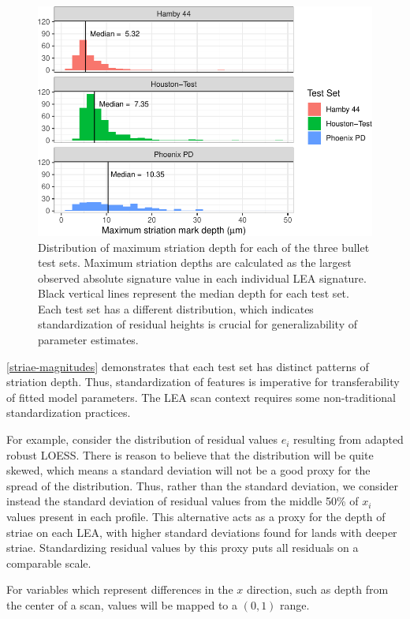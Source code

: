 \documentclass[12pt]{article}
\begin{document}
\begin{figure}
\centering
\includegraphics{writeup_files/figure-latex/striae-magnitudes-1.pdf}
\caption{\label{striae-magnitudes}Distribution of maximum striation
depth for each of the three bullet test sets. Maximum striation depths
are calculated as the largest observed absolute signature value in each
individual LEA signature. Black vertical lines represent the median
depth for each test set. Each test set has a different distribution,
which indicates standardization of residual heights is crucial for
generalizability of parameter estimates.}
\end{figure}

\autoref{striae-magnitudes} demonstrates that each test set has distinct
patterns of striation depth. Thus, standardization of features is
imperative for transferability of fitted model parameters. The LEA scan
context requires some non-traditional standardization practices.

For example, consider the distribution of residual values \(e_i\)
resulting from adapted robust LOESS. There is reason to believe that the
distribution will be quite skewed, which means a standard deviation will
not be a good proxy for the spread of the distribution. Thus, rather
than the standard deviation, we consider instead the standard deviation
of residual values from the middle 50\% of \(x_i\) values present in
each profile. This alternative acts as a proxy for the depth of striae
on each LEA, with higher standard deviations found for lands with deeper
striae. Standardizing residual values by this proxy puts all residuals
on a comparable scale.

For variables which represent differences in the \(x\) direction, such
as depth from the center of a scan, values will be mapped to a
\((0, 1)\) range.
\end{document}
